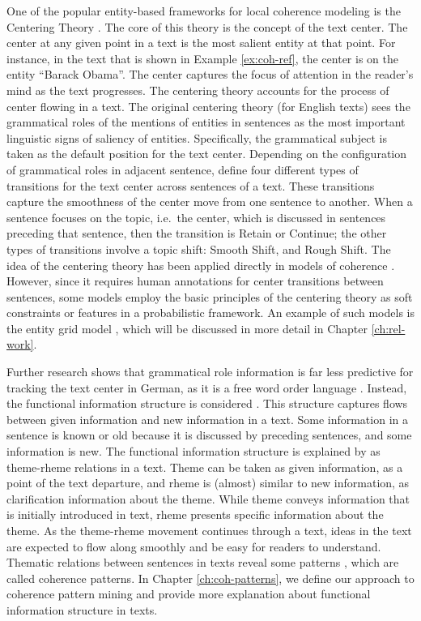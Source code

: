 One of the popular entity-based frameworks for local coherence modeling is the Centering Theory \cite{grosz95}. 
The core of this theory is the concept of the text center. 
The center at any given point in a text is the most salient entity at that point. 
For instance, in the text that is shown in Example \ref{ex:coh-ref}, the center is on the entity ``Barack Obama''.
The center captures the focus of attention in the reader's mind \cite{grosz95} as the text progresses. 
The centering theory accounts for the process of center flowing in a text. 
The original centering theory (for English texts) sees the grammatical roles of the mentions of entities in sentences as the most important linguistic signs of saliency of entities. 
Specifically, the grammatical subject is taken as the default position for the text center. 
Depending on the configuration of grammatical roles in adjacent sentence,  define four different types of transitions for the text center across sentences of a text. 
These transitions capture the smoothness of the center move from one sentence to another. 
When a sentence focuses on the topic, i.e.\ the center, which is discussed in sentences preceding that sentence, then the transition is Retain or Continue; the other types of transitions involve a topic shift: Smooth Shift, and Rough Shift. 
The idea of the centering theory has been applied directly in models of coherence \cite{karamanis04a}.  
However, since it requires human annotations for center transitions between sentences, some models employ the basic principles of the centering theory as soft constraints or features in a probabilistic framework. 
An example of such models is the entity grid model \cite{barzilay05a,barzilay08}, which will be discussed in more detail in Chapter \ref{ch:rel-work}.

Further research shows that grammatical role information is far less predictive for tracking the text center in German, as it is a free word order language \cite{strube.acl96}. 
Instead, the functional information structure is considered \cite{danes74}.  
This structure captures flows between given information and new information in a text. 
Some information in a sentence is known or old because it is discussed by preceding sentences, and some information is new. 
The functional information structure is explained by  as \mbox{theme-rheme} relations in a text. 
Theme can be taken as given information, as a point of the text departure, and rheme is (almost) similar to new information, as clarification information about the theme. 
While theme conveys information that is initially introduced in text, rheme presents specific 
information about the theme. 
As the theme-rheme movement continues through a text, ideas in the text are expected to flow along smoothly and be easy for readers to understand. 
Thematic relations between sentences in texts reveal some patterns \cite{danes74}, which are called coherence patterns.
In Chapter \ref{ch:coh-patterns}, we define our approach to coherence pattern mining and provide more explanation about functional information structure \cite{danes74} in texts. 

